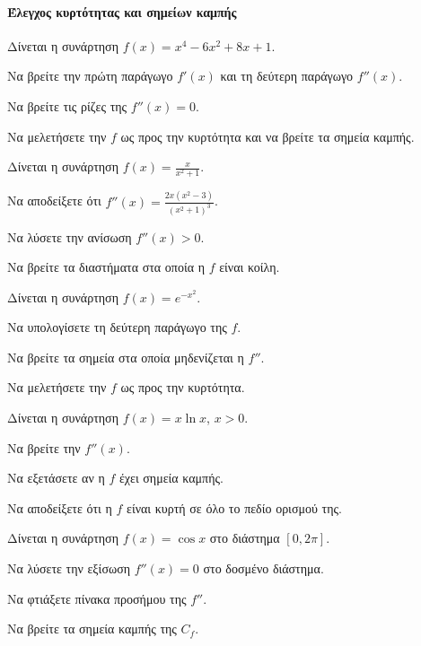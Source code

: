 \documentclass[11pt,a4paper,modern]{FFExercises}
\begin{document}

\paragraph{Έλεγχος κυρτότητας και σημείων καμπής}

\askhsh
Δίνεται η συνάρτηση $f(x)=x^4-6x^2+8x+1$.
\begin{alist}
    \item Να βρείτε την πρώτη παράγωγο $f'(x)$ και τη δεύτερη παράγωγο $f''(x)$.
    \item Να βρείτε τις ρίζες της $f''(x)=0$.
    \item Να μελετήσετε την $f$ ως προς την κυρτότητα και να βρείτε τα σημεία καμπής.
\end{alist}

\askhsh
Δίνεται η συνάρτηση $f(x) = \frac{x}{x^2+1}$.
\begin{alist}
    \item Να αποδείξετε ότι $f''(x) = \frac{2x(x^2-3)}{(x^2+1)^3}$.
    \item Να λύσετε την ανίσωση $f''(x)>0$.
    \item Να βρείτε τα διαστήματα στα οποία η $f$ είναι κοίλη.
\end{alist}

\askhsh
Δίνεται η συνάρτηση $f(x) = e^{-x^2}$.
\begin{alist}
    \item Να υπολογίσετε τη δεύτερη παράγωγο της $f$.
    \item Να βρείτε τα σημεία στα οποία μηδενίζεται η $f''$.
    \item Να μελετήσετε την $f$ ως προς την κυρτότητα.
\end{alist}

\askhsh
Δίνεται η συνάρτηση $f(x) = x \ln x$, $x>0$.
\begin{alist}
    \item Να βρείτε την $f''(x)$.
    \item Να εξετάσετε αν η $f$ έχει σημεία καμπής.
    \item Να αποδείξετε ότι η $f$ είναι κυρτή σε όλο το πεδίο ορισμού της.
\end{alist}

\askhsh
Δίνεται η συνάρτηση $f(x) = \cos x$ στο διάστημα $[0, 2\pi]$.
\begin{alist}
    \item Να λύσετε την εξίσωση $f''(x)=0$ στο δοσμένο διάστημα.
    \item Να φτιάξετε πίνακα προσήμου της $f''$.
    \item Να βρείτε τα σημεία καμπής της $C_f$.
\end{alist}
\end{document}
